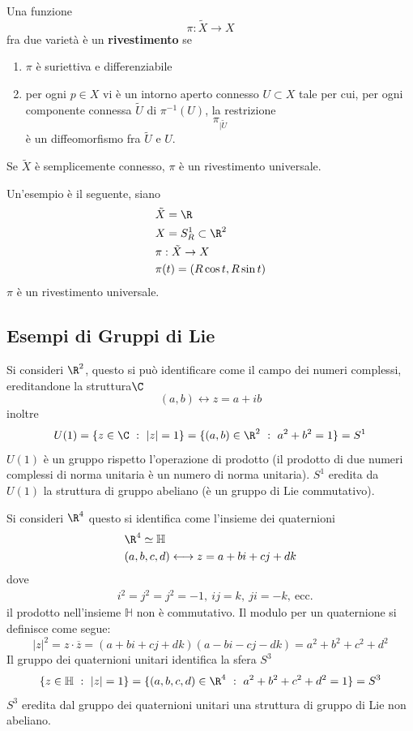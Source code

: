 \documentclass[10pt, letterpaper]{report}
\begin{document}
\begin{definizione}\label{def:rivestimento}
    Una funzione \begin{equation}
        \pi:\tilde X\rightarrow X 
    \end{equation}
    fra due varietà è un \textbf{rivestimento} se \begin{enumerate}
        \item $\pi$ è suriettiva e differenziabile
        \item per ogni $p\in X$ vi è un intorno aperto connesso $U\subset X$ tale per cui, per ogni componente connessa $\tilde U$
 di $\pi^{-1}(U)$, la restrizione $$ \pi_{|\tilde U}$$ è un diffeomorfismo fra $\tilde U$ e $U$.    \end{enumerate}
 Se $\tilde X$ è semplicemente connesso, $\pi$ è un rivestimento universale.
\end{definizione}
Un'esempio è il seguente, siano\begin{align}
    &\tilde X =\R\\ 
    &X=S_R^1\subset \R^2\\
    &\pi : \tilde X\rightarrow X\\ 
    &\pi(t)=(R\cos t,R\sin t)
\end{align}
$\pi$ è un rivestimento universale.
\subsection{Esempi di Gruppi di Lie}
Si consideri $\R^2$, questo si può identificare come il campo dei numeri complessi, ereditandone la struttura$\C$\begin{equation}
    (a,b)\longleftrightarrow z=a+ib
\end{equation}
inoltre\begin{equation}
    U(1)=\{z\in\C \ : \ |z|=1\}=\{(a,b)\in\R^2 \ : \ a^2+b^2=1\}=S^1
\end{equation}
$U(1)$ è un gruppo rispetto l'operazione di prodotto (il prodotto di due numeri complessi di norma unitaria è un numero di norma unitaria). $S^1$ eredita da $U(1)$ la struttura di gruppo abeliano (è un gruppo di Lie commutativo).\bigskip

Si consideri $\R^4$ questo si identifica come l'insieme dei quaternioni \begin{align}
    &\R^4\simeq\mathbb H\\ 
    &(a,b,c,d)\longleftrightarrow z= a+bi+cj+dk
\end{align}
dove\begin{align}
    &i^2=j^2=j^2=-1, \ ij=k, \ ji=-k, \ \text{ecc.}
\end{align}
il prodotto nell'insieme $\mathbb H$ non è commutativo. Il modulo per un quaternione si definisce come segue:\begin{equation}
|z|^2=z\cdot\overline z=(a+bi+cj+dk)(a-bi-cj-dk)=a^2+b^2+c^2+d^2
\end{equation} Il gruppo dei quaternioni unitari identifica la sfera $S^3$\begin{equation}
    \{z\in\mathbb H \ : \ |z|=1\}=\{(a,b,c,d)\in\R^4 \ : \ a^2+b^2+c^2+d^2=1\}=S^3
\end{equation}
$S^3$ eredita dal gruppo dei quaternioni unitari una struttura di gruppo di Lie non abeliano.\bigskip
\end{document}
